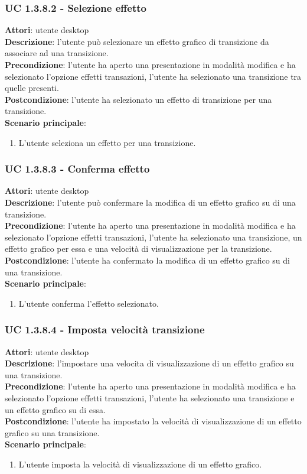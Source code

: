 \subsubsection{UC 1.3.8.2 - Selezione effetto}{
	\label{uc1.3.8.2}
	\textbf{Attori}: utente desktop \\
	\textbf{Descrizione}: l'utente può selezionare un effetto grafico di transizione da associare ad una transizione. \\
	\textbf{Precondizione}: l'utente ha aperto una presentazione in modalità modifica e ha selezionato l'opzione effetti transazioni, l'utente ha selezionato una transizione tra quelle presenti.	\\
	\textbf{Postcondizione}: l'utente ha selezionato un effetto di transizione per una transizione.	\\
	\textbf{Scenario principale}:
	\begin{enumerate}
		\item L'utente seleziona un effetto per una transizione.
	\end{enumerate}
}
\subsubsection{UC 1.3.8.3 - Conferma effetto}{
	\label{uc1.3.8.3}
	\textbf{Attori}: utente desktop \\
	\textbf{Descrizione}: l'utente può confermare la modifica di un effetto grafico su di una transizione. \\
	\textbf{Precondizione}: l'utente ha aperto una presentazione in modalità modifica e ha selezionato l'opzione effetti transazioni, l'utente ha selezionato una transizione, un effetto grafico per essa e una velocità di visualizzazione per la transizione.	\\
	\textbf{Postcondizione}: l'utente ha confermato la modifica di un effetto grafico su di una transizione.\\
	\textbf{Scenario principale}:
	\begin{enumerate}
		\item L'utente conferma l'effetto selezionato.
	\end{enumerate}
}
\subsubsection{UC 1.3.8.4 - Imposta velocità transizione}{
	\label{uc1.3..8.4}
	\textbf{Attori}: utente desktop \\
	\textbf{Descrizione}: l'impostare una velocita di visualizzazione di un effetto grafico su una transizione. \\
	\textbf{Precondizione}: l'utente ha aperto una presentazione in modalità modifica e ha selezionato l'opzione effetti transazioni, l'utente ha selezionato una transizione e un effetto grafico su di essa.	\\
	\textbf{Postcondizione}: l'utente ha impostato la velocità di visualizzazione di un effetto grafico su una transizione.\\
	\textbf{Scenario principale}:
	\begin{enumerate}
		\item L'utente imposta la velocità di visualizzazione di un effetto grafico.
	\end{enumerate}
}
